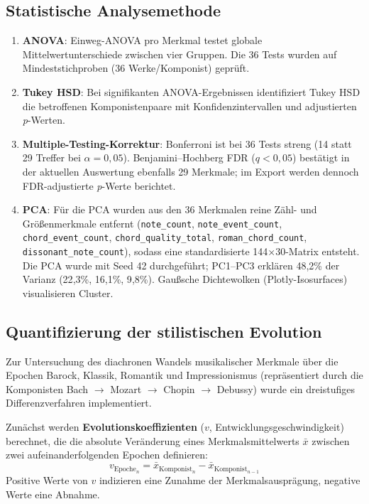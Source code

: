 \documentclass[12pt,a4paper]{article}
\theoremstyle{definition}
\begin{document}
\subsection{Statistische Analysemethode}
\begin{enumerate}
    \item \textbf{ANOVA}: Einweg-ANOVA pro Merkmal testet globale Mittelwertunterschiede zwischen vier Gruppen. Die 36 Tests wurden auf Mindeststichproben (36 Werke/Komponist) geprüft.
    \item \textbf{Tukey HSD}: Bei signifikanten ANOVA-Ergebnissen identifiziert Tukey HSD die betroffenen Komponistenpaare mit Konfidenzintervallen und adjustierten \textit{p}-Werten.
    \item \textbf{Multiple-Testing-Korrektur}: Bonferroni ist bei 36 Tests streng (14 statt 29 Treffer bei \(\alpha=0{,}05\)). Benjamini--Hochberg FDR (\(q<0{,}05\)) bestätigt in der aktuellen Auswertung ebenfalls 29 Merkmale; im Export werden dennoch FDR-adjustierte \textit{p}-Werte berichtet.\autocite[Vgl.][]{Benjamini1995}
    \item \textbf{PCA}: Für die PCA wurden aus den 36 Merkmalen reine Zähl- und Größenmerkmale entfernt (\texttt{note\_count}, \texttt{note\_event\_count}, \texttt{chord\_event\_count}, \texttt{chord\_quality\_total}, \texttt{roman\_chord\_count}, \texttt{dissonant\_note\_count}), sodass eine standardisierte 144×30-Matrix entsteht. Die PCA wurde mit Seed 42 durchgeführt; PC1--PC3 erklären 48{,}2\% der Varianz (22{,}3\%, 16{,}1\%, 9{,}8\%). Gaußsche Dichtewolken (Plotly-Isosurfaces) visualisieren Cluster.
\end{enumerate}

\subsection{Quantifizierung der stilistischen Evolution}
Zur Untersuchung des diachronen Wandels musikalischer Merkmale über die Epochen Barock, Klassik, Romantik und Impressionismus (repräsentiert durch die Komponisten Bach $\rightarrow$ Mozart $\rightarrow$ Chopin $\rightarrow$ Debussy) wurde ein dreistufiges Differenzverfahren implementiert. 

Zunächst werden \textbf{Evolutionskoeffizienten} ($v$, Entwicklungsgeschwindigkeit) berechnet, die die absolute Veränderung eines Merkmalsmittelwerts $\bar{x}$ zwischen zwei aufeinanderfolgenden Epochen definieren:
\begin{equation}
v_{\text{Epoche}_n} = \bar{x}_{\text{Komponist}_n} - \bar{x}_{\text{Komponist}_{n-1}}
\end{equation}
Positive Werte von $v$ indizieren eine Zunahme der Merkmalsausprägung, negative Werte eine Abnahme.
\end{document}
